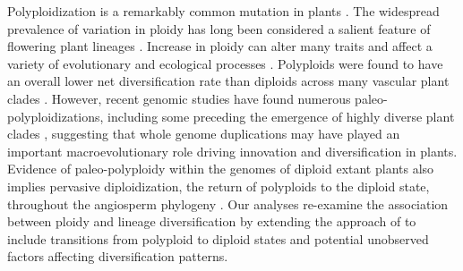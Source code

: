 Polyploidization is a remarkably common mutation in plants \citep{husband_2013, zenilferguson_2017}.
The widespread prevalence of variation in ploidy has long been considered a salient feature of flowering plant lineages \citep{stebbins1938}. 
Increase in ploidy can alter many traits and affect a variety of evolutionary and ecological processes \citep{ramsey_2002, sessa_2019}.
Polyploids were found to have an overall lower net diversification rate than diploids across many vascular plant clades \citep{mayrose_2011, mayrose_2015}. 
However, recent genomic studies have found numerous paleo-polyploidizations, including some preceding the emergence of highly diverse plant clades \citep{soltis_2014, landis_2018}, suggesting that whole genome duplications may have played an important macroevolutionary role driving innovation and diversification in plants. 
Evidence of paleo-polyploidy within the genomes of diploid extant plants also implies pervasive diploidization, the return of polyploids to the diploid state, throughout the angiosperm phylogeny \citep{soltis_2015, dodsworth_2015}.
Our analyses re-examine the association between ploidy and lineage diversification by extending the approach of \citet{mayrose_2011, mayrose_2015} to include transitions from polyploid to diploid states and potential unobserved factors affecting diversification patterns.

